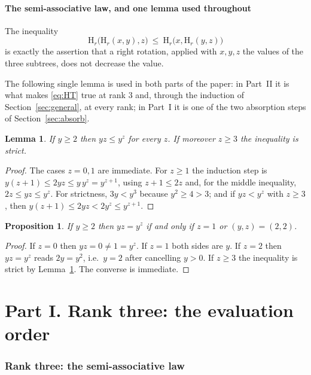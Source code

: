 \documentclass[11pt,a4paper]{article}
\theoremstyle{plain}
\newtheorem{proposition}[theorem]{Proposition}
\newtheorem{lemma}[theorem]{Lemma}
\theoremstyle{definition}
\newcommand{\HH}{\mathrm{H}}
\begin{document}
\subsection{The semi-associative law, and one lemma used throughout}

The inequality
\begin{equation*}\label{eq:HT}
  \HH_r\bigl(\HH_r(x,y),z\bigr)\ \le\ \HH_r\bigl(x,\HH_r(y,z)\bigr)
  \tag{HT$_r$}
\end{equation*}
is exactly the assertion that a right rotation, applied with $x,y,z$ the values of
the three subtrees, does not decrease the value.

The following single lemma is used in both parts of the paper: in Part~II it is what
makes \eqref{eq:HT} true at rank $3$ and, through the induction of
Section~\ref{sec:general}, at every rank; in Part~I it is one of the two absorption
steps of Section~\ref{sec:absorb}.

\begin{lemma}\label{lem:mul-le-pow}
If $y\ge2$ then $yz\le y^{z}$ for every $z$. If moreover $z\ge3$ the inequality is strict.
\end{lemma}

\begin{proof}
The cases $z=0,1$ are immediate. For $z\ge1$ the induction step is
$y(z+1)\le2yz\le y\,y^{z}=y^{z+1}$, using $z+1\le2z$ and, for the middle inequality,
$2z\le yz\le y^{z}$. For strictness, $3y<y^{3}$ because $y^{2}\ge4>3$; and if
$yz<y^{z}$ with $z\ge3$, then $y(z+1)\le2yz<2y^{z}\le y^{z+1}$.
\end{proof}

\begin{proposition}\label{prop:mul-eq-pow}
If $y\ge2$ then $yz=y^{z}$ if and only if $z=1$ or $(y,z)=(2,2)$.
\end{proposition}

\begin{proof}
If $z=0$ then $yz=0\ne1=y^{z}$. If $z=1$ both sides are $y$. If $z=2$ then
$yz=y^{z}$ reads $2y=y^{2}$, i.e.\ $y=2$ after cancelling $y>0$. If $z\ge3$ the
inequality is strict by Lemma~\ref{lem:mul-le-pow}. The converse is immediate.
\end{proof}

\part*{Part I. Rank three: the evaluation order}
\section{Rank three: the semi-associative law}\label{sec:rank3}
\end{document}
